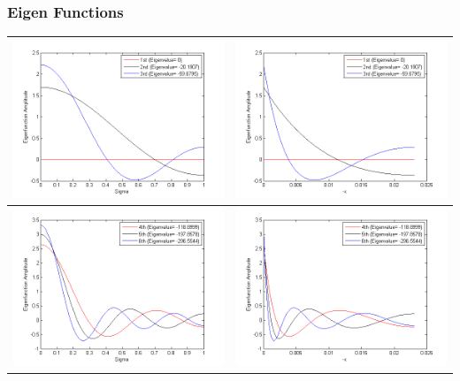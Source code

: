 				\begin{frame}
		\frametitle{Eigen Functions}
		\begin{tabular}{|c|c|}\hline
		\includegraphics[width=.45\textwidth]{Eigenfunctions1.png}&\includegraphics[width=.45\textwidth]{Eigenfunctionsx1.png}\\\hline
		\includegraphics[width=.45\textwidth]{Eigenfunctions2.png}&\includegraphics[width=.45\textwidth]{Eigenfunctionsx2.png}\\\hline
		\end{tabular}
		
	\end{frame}
	
	
	
	
		
